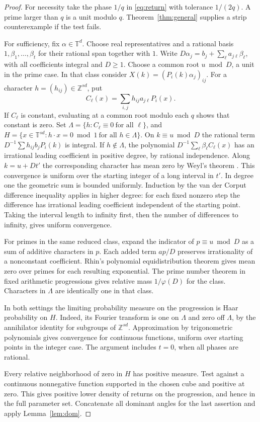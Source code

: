 \documentclass[11pt,letterpaper]{article}
\newcommand{\T}{\mathbb T}
\newcommand{\Z}{\mathbb Z}
\begin{document}
\begin{proof}
For necessity take the phase \(1/q\) in \eqref{eq:return} with tolerance \(1/(2q)\). A prime larger than \(q\) is a unit modulo \(q\). Theorem~\ref{thm:general} supplies a strip counterexample if the test fails.

For sufficiency, fix \(\alpha\in\T^d\). Choose real representatives and a rational basis \(1,\beta_1,\ldots,\beta_t\) for their rational span together with \(1\). Write \(D\alpha_j=b_j+\sum_\ell a_{j\ell}\beta_\ell\), with all coefficients integral and \(D\ge1\). Choose a common root \(u\bmod D\), a unit in the prime case. In that class consider
\(X(k)=(P_i(k)\alpha_j)_{ij}\). For a character \(h=(h_{ij})\in\Z^{sd}\), put
\[
 C_\ell(x)=\sum_{i,j}h_{ij}a_{j\ell}P_i(x).
\]
If \(C_\ell\) is constant, evaluating at a common root modulo each \(q\) shows that constant is zero. Set
\(\Lambda=\{h:C_\ell\equiv0\ \text{for all }\ell\}\), and
\(H=\{x\in\T^{sd}:h\cdot x=0\bmod1\ \text{for all }h\in\Lambda\}\).
On \(k\equiv u\bmod D\) the rational term
\(D^{-1}\sum h_{ij}b_jP_i(k)\) is integral. If \(h\notin\Lambda\), the polynomial \(D^{-1}\sum_\ell \beta_\ell C_\ell(x)\) has an irrational leading coefficient in positive degree, by rational independence.
Along \(k=u+Dt'\) the corresponding character has mean zero by Weyl's theorem \cite{weyl}. This convergence is uniform over the starting integer of a long interval in \(t'\). In degree one the geometric sum is bounded uniformly. Induction by the van der Corput difference inequality applies in higher degree: for each fixed nonzero step the difference has irrational leading coefficient independent of the starting point. Taking the interval length to infinity first, then the number of differences to infinity, gives uniform convergence.

For primes in the same reduced class, expand the indicator of \(p\equiv u\bmod D\) as a sum of additive characters in \(p\). Each added term \(ap/D\) preserves irrationality of a nonconstant coefficient. Rhin's polynomial equidistribution theorem \cite{rhin} gives mean zero over primes for each resulting exponential. The prime number theorem in fixed arithmetic progressions gives relative mass \(1/\varphi(D)\) for the class. Characters in \(\Lambda\) are identically one in that class.

In both settings the limiting probability measure on the progression is Haar probability on \(H\). Indeed, its Fourier transform is one on \(\Lambda\) and zero off \(\Lambda\), by the annihilator identity for subgroups of \(\Z^{sd}\). Approximation by trigonometric polynomials gives convergence for continuous functions, uniform over starting points in the integer case. The argument includes \(t=0\), when all phases are rational.

Every relative neighborhood of zero in \(H\) has positive measure. Test against a continuous nonnegative function supported in the chosen cube and positive at zero. This gives positive lower density of returns on the progression, and hence in the full parameter set. Concatenate all dominant angles for the last assertion and apply Lemma~\ref{lem:dom}.
\end{proof}
\end{document}
